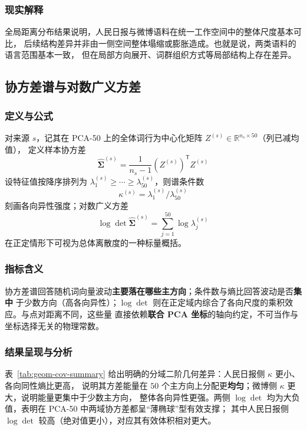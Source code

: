 \documentclass[withoutpreface]{cumcmthesis}
\begin{document}
\FloatBarrier

\subsubsection{现实解释}
全局距离分布结果说明，人民日报与微博语料在统一工作空间中的整体尺度基本可比，
后续结构差异并非由一侧空间整体塌缩或膨胀造成。也就是说，两类语料的语言范围基本一致，
但在局部方向展开、词群组织方式等局部结构上存在差异。

\subsection{协方差谱与对数广义方差}

\subsubsection{定义与公式}
对来源 $s$，记其在 PCA-50 上的全体词行为中心化矩阵 $Z^{(s)}\in\mathbb{R}^{n_s\times 50}$（列已减均值），
定义样本协方差
\begin{equation}
  \hat{\boldsymbol{\Sigma}}^{(s)}=\frac{1}{n_s-1}(Z^{(s)})^{\mathsf{T}}Z^{(s)}
\end{equation}
设特征值按降序排列为 $\lambda^{(s)}_1\ge\cdots\ge\lambda^{(s)}_{50}$，则谱条件数
\begin{equation}
  \kappa^{(s)}=\lambda^{(s)}_1/\lambda^{(s)}_{50}
\end{equation}
刻画各向异性强度；对数广义方差
\begin{equation}
  \log\det\hat{\boldsymbol{\Sigma}}^{(s)}=\sum_{j=1}^{50}\log\lambda^{(s)}_j
\end{equation}
在正定情形下可视为总体离散度的一种标量概括。

\subsubsection{指标含义}
协方差谱回答随机词向量波动\textbf{主要落在哪些主方向}；条件数与熵比回答波动是否\textbf{集中}
于少数方向（高各向异性）；$\log\det$ 则在正定域内综合了各向尺度的乘积效应。与点对距离不同，这些量
直接依赖\textbf{联合 PCA 坐标}的轴向约定，不可当作与坐标选择无关的物理常数。

\subsubsection{结果呈现与分析}
表~\ref{tab:geom-cov-summary} 给出明确的分域二阶几何差异：人民日报侧 $\kappa$ 更小、各向同性熵比更高，
说明其方差能量在 $50$ 个主方向上分配更\textbf{均匀}；微博侧 $\kappa$ 更大，说明能量更集中于少数主方向，
整体各向异性更强。两侧 $\log\det$ 均为大负值，表明在 PCA-50 中两域协方差都呈“薄椭球”型有效支撑；
其中人民日报侧 $\log\det$ 较高（绝对值更小），对应其有效体积相对更大。
\end{document}
